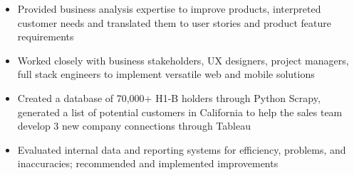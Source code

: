 \documentclass{resume}
\begin{document}
\begin{itemize}
    \item Provided business analysis expertise to improve products, interpreted customer needs and translated them to user stories and product feature requirements
    \item Worked closely with business stakeholders, UX designers, project managers, full stack engineers to implement versatile web and mobile solutions
    \item Created a database of 70,000+ H1-B holders through Python Scrapy, generated a list of potential customers in California to help the sales team develop 3 new company connections through Tableau
    \item Evaluated internal data and reporting systems for efficiency, problems, and inaccuracies; recommended and implemented improvements
\end{itemize}



%
%
\end{document}
